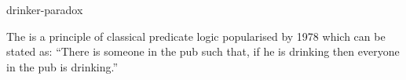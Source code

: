 \documentclass{stex}
\begin{document}
\begin{smodule}{drinker-paradox}
\begin{sparagraph}[style=symdoc]
  The  is a principle of classical predicate logic popularised by  1978 which can be stated as:
  “There is someone in the pub such that, if he is drinking then everyone in the pub is drinking.”
\end{sparagraph}
\end{smodule}
\end{document}
